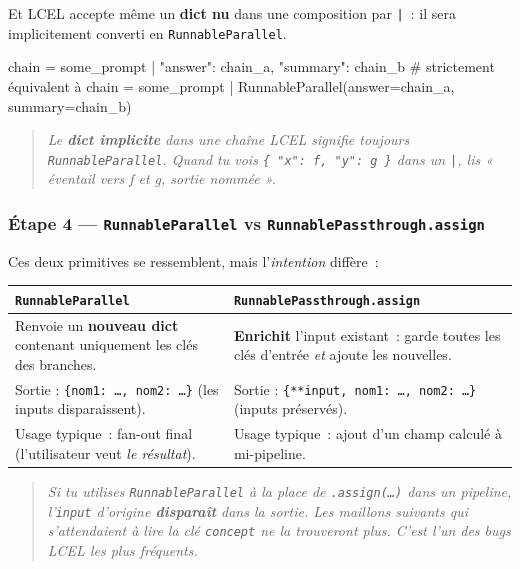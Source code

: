 \documentclass[11pt,a4paper]{article}
\begin{document}
Et LCEL accepte même un \textbf{dict nu} dans une composition par
\texttt{|}~: il sera implicitement converti en \texttt{RunnableParallel}.

\begin{pythoncode}
chain = some_prompt | {"answer": chain_a, "summary": chain_b}
# strictement équivalent à
chain = some_prompt | RunnableParallel(answer=chain_a, summary=chain_b)
\end{pythoncode}

\begin{quote}\itshape
Le \textbf{dict implicite} dans une chaîne LCEL signifie toujours
\texttt{RunnableParallel}. Quand tu vois \texttt{\{ "x": f, "y": g \}} dans
un \texttt{|}, lis « éventail vers f et g, sortie nommée ».
\end{quote}

\subsubsection*{Étape 4 — \texttt{RunnableParallel} vs \texttt{RunnablePassthrough.assign}}

Ces deux primitives se ressemblent, mais l'\emph{intention} diffère~:

\begin{center}
\begin{tabular}{p{6.5cm} p{6.5cm}}
\toprule
\textbf{\texttt{RunnableParallel}} & \textbf{\texttt{RunnablePassthrough.assign}} \\
\midrule
Renvoie un \textbf{nouveau dict} contenant uniquement les clés des branches.
& \textbf{Enrichit} l'input existant~: garde toutes les clés d'entrée \emph{et} ajoute les nouvelles.
\\[1mm]
Sortie : \texttt{\{nom1: \dots, nom2: \dots\}} (les inputs disparaissent).
& Sortie : \texttt{\{**input, nom1: \dots, nom2: \dots\}} (inputs préservés).
\\[1mm]
Usage typique~: fan-out final (l'utilisateur veut \emph{le résultat}).
& Usage typique~: ajout d'un champ calculé à mi-pipeline.
\\
\bottomrule
\end{tabular}
\end{center}

\begin{quote}\itshape
Si tu utilises \texttt{RunnableParallel} à la place de
\texttt{.assign(\dots)} dans un pipeline, l'\texttt{input} d'origine
\textbf{disparaît} dans la sortie. Les maillons suivants qui s'attendaient
à lire la clé \texttt{concept} ne la trouveront plus. C'est l'un des bugs
LCEL les plus fréquents.
\end{quote}
\end{document}
